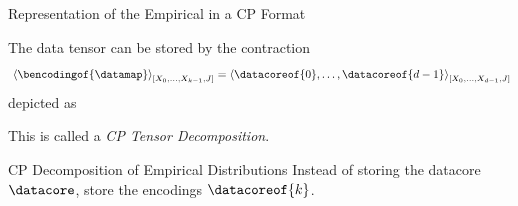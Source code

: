 \documentclass{beamer}
\begin{document}
\begin{frame}{Representation of the Empirical in a CP Format}

The data tensor can be stored by the contraction
	\[ \contractionof{\bencodingof{\datamap}}{\catvariableof{0},\ldots,\catvariableof{\atomenumerator-1},\datvariable} =
	\contractionof{\datacoreof{0},\ldots,\datacoreof{\atomorder-1}}{\catvariableof{0},\ldots,\catvariableof{\atomorder-1},\datvariable} \]
depicted as
\begin{center}
	
\end{center}
This is called a \emph{CP Tensor Decomposition}.

\begin{block}{CP Decomposition of Empirical Distributions}
	Instead of storing the datacore $\datacore$, store the encodings $\datacoreof{\atomenumerator}$.
\end{block}

\end{frame}
\end{document}
